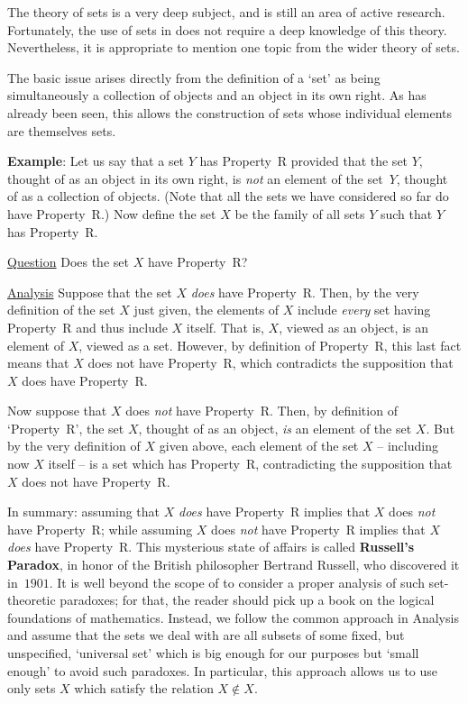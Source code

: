         The theory of sets is a very deep subject, and is still an area of active research.
    Fortunately, the use of sets in {\TheseNotes} does not require a deep knowledge of this theory.
    Nevertheless, it is appropriate to mention one topic from the wider theory of sets.

        The basic issue arises directly from the definition of a `set' as being simultaneously a collection of objects and an object in its own right.
    As has already been seen, this allows the construction of sets whose individual elements are themselves sets.

\V

        {\bf Example}: Let us say that a set $Y$ has Property~R provided that the set $Y$,
    thought of as an object in its own right, is {\em not} an element of the set~$Y$, thought of as a collection of objects.
    (Note that all the sets we have considered so far do have Property~R.)
    Now define the set $X$ be the family of all sets $Y$ such that $Y$ has Property~R.

        \underline{Question} Does the set $X$ have Property~R?

        \underline{Analysis} Suppose that the set $X$ {\em does} have Property~R.
    Then, by the very definition of the set $X$ just given, the elements of $X$ include {\em every} set having Property~R and thus include $X$ itself.
    That is, $X$, viewed as an object, is an element of $X$, viewed as a set. However, by definition of Property~R,
    this last fact means that $X$ does not have Property~R, which contradicts the supposition that $X$ does have Property~R.

        Now suppose that $X$ does {\em not} have Property~R. Then, by definition of `Property~R',
    the set $X$, thought of as an object, {\em is} an element of the set $X$.
    But by the very definition of $X$ given above, each element of the set $X$ -- including now $X$ itself --
    is a set which has Property~R, contradicting the supposition that $X$ does not have Property~R.

    In summary: assuming that $X$ {\em does} have Property~R implies that $X$ does {\em not} have Property~R;
    while assuming $X$ does {\em not} have Property~R implies that $X$ {\em does} have Property~R.
        This mysterious state of affairs is called {\bf Russell's Paradox},
    in honor of the British philosopher Bertrand Russell, who discovered it in~$1901$.
    It is well beyond the scope of {\TheseNotes} to consider a proper analysis of such set-theoretic paradoxes;
    for that, the reader should pick up a book on the logical foundations of mathematics.
    Instead, we follow the common approach in Analysis and assume that the sets we deal with are all subsets of some fixed,
    but unspecified, `universal set' which is big enough for our purposes but `small enough' to avoid such paradoxes.
    In particular, this approach allows us to use only sets $X$ which satisfy the relation $X \not \in X$.

